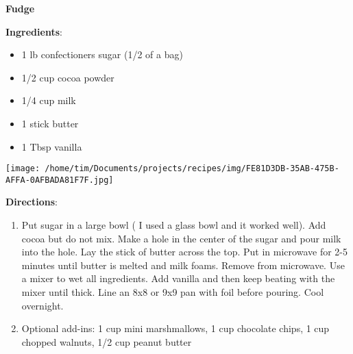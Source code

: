 \documentclass[11pt, twoside, openany]{book}
\begin{document}
\noindent\begin{minipage}[t]{\linewidth}%
{\Large\textbf{Fudge}} \label{fudge}\hfill\textit{}\\
\noindent\begin{minipage}[t]{0.78\linewidth}%
\textbf{Ingredients}:\vspace{-3mm}
\begin{multicols}{2}
\begin{itemize}\setlength\itemsep{-1mm}
\item 1 lb confectioners sugar (1/2 of a bag)
\item 1/2 cup cocoa powder
\item 1/4 cup milk
\item 1 stick butter
\item 1 Tbsp vanilla
\end{itemize}
\end{multicols}
\end{minipage}
\noindent\begin{minipage}[t]{0.18\linewidth}
\centering \strut\vspace*{-\baselineskip}\newline
\texttt{[image: /home/tim/Documents/projects/recipes/img/FE81D3DB-35AB-475B-AFFA-0AFBADA81F7F.jpg]}\\
\end{minipage}\vspace{3mm}
\textbf{Directions}:
\vspace{-3mm}\begin{enumerate}\setlength\itemsep{-1mm}
\item Put sugar in a large bowl ( I used a glass bowl and it worked well). Add cocoa but do not mix. Make a hole in the center of the sugar and pour milk into the hole. Lay the stick of butter across the top. Put in microwave for 2-5 minutes until butter is melted and milk foams. Remove from microwave. Use a mixer to wet all ingredients. Add vanilla and then keep beating with the mixer until thick. Line an 8x8 or 9x9 pan with foil before pouring. Cool overnight.
\item Optional add-ins: 1 cup mini marshmallows, 1 cup chocolate chips, 1 cup chopped walnuts, 1/2 cup peanut butter
\end{enumerate}
\end{minipage}\vspace{8mm}
\end{document}
